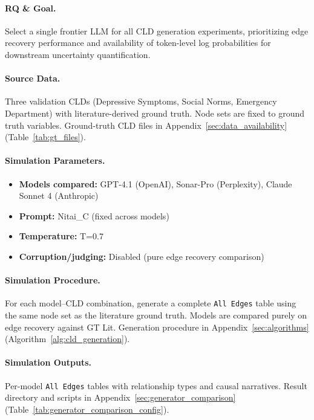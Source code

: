 \paragraph{RQ \& Goal.}
Select a single frontier LLM for all CLD generation experiments, prioritizing edge recovery performance and availability of token-level log probabilities for downstream uncertainty quantification.

\paragraph{Source Data.}
Three validation CLDs (Depressive Symptoms, Social Norms, Emergency Department) with literature-derived ground truth. Node sets are fixed to ground truth variables.
Ground-truth CLD files in Appendix~\ref{sec:data_availability} (Table~\ref{tab:gt_files}).

\paragraph{Simulation Parameters.}
\begin{itemize}[noitemsep]
    \item \textbf{Models compared:} GPT-4.1 (OpenAI), Sonar-Pro (Perplexity), Claude Sonnet 4 (Anthropic)
    \item \textbf{Prompt:} Nitai\_C (fixed across models)
    \item \textbf{Temperature:} T=0.7
    \item \textbf{Corruption/judging:} Disabled (pure edge recovery comparison)
\end{itemize}

\paragraph{Simulation Procedure.}
For each model--CLD combination, generate a complete \texttt{All Edges} table using the same node set as the literature ground truth. Models are compared purely on edge recovery against GT Lit.
Generation procedure in Appendix~\ref{sec:algorithms} (Algorithm~\ref{alg:cld_generation}).

\paragraph{Simulation Outputs.}
Per-model \texttt{All Edges} tables with relationship types and causal narratives.
Result directory and scripts in Appendix~\ref{sec:generator_comparison} (Table~\ref{tab:generator_comparison_config}).

